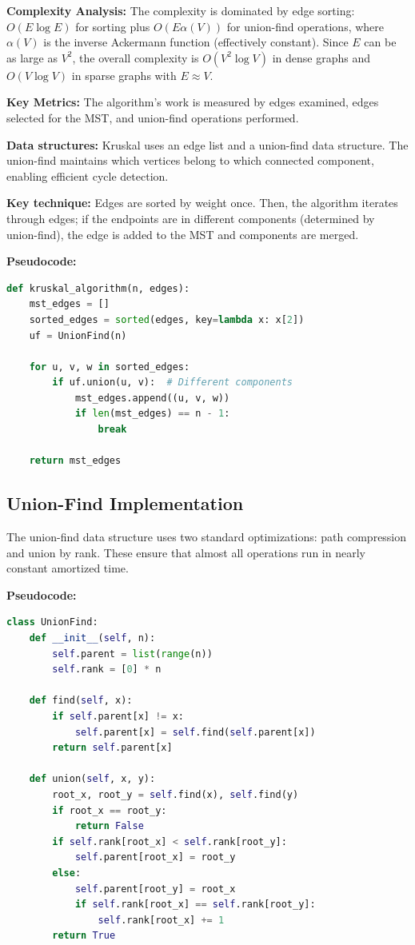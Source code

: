 \documentclass{labreport}
\begin{document}
    \textbf{Complexity Analysis:}
    The complexity is dominated by edge sorting: $O(E \log E)$ for sorting plus $O(E \alpha(V))$ for union-find operations, where $\alpha(V)$ is the inverse Ackermann function (effectively constant). Since $E$ can be as large as $V^2$, the overall complexity is $O(V^2 \log V)$ in dense graphs and $O(V \log V)$ in sparse graphs with $E \approx V$.

    \textbf{Key Metrics:} The algorithm's work is measured by edges examined, edges selected for the MST, and union-find operations performed.

\textbf{Data structures:} Kruskal uses an edge list and a union-find data structure. The union-find maintains which vertices belong to which connected component, enabling efficient cycle detection.

\textbf{Key technique:} Edges are sorted by weight once. Then, the algorithm iterates through edges; if the endpoints are in different components (determined by union-find), the edge is added to the MST and components are merged.

\textbf{Pseudocode:}
\begin{lstlisting}[language=Python]
def kruskal_algorithm(n, edges):
    mst_edges = []
    sorted_edges = sorted(edges, key=lambda x: x[2])
    uf = UnionFind(n)
    
    for u, v, w in sorted_edges:
        if uf.union(u, v):  # Different components
            mst_edges.append((u, v, w))
            if len(mst_edges) == n - 1:
                break
    
    return mst_edges
\end{lstlisting}

\subsection{Union-Find Implementation}

The union-find data structure uses two standard optimizations: path compression and union by rank. These ensure that almost all operations run in nearly constant amortized time.

\textbf{Pseudocode:}
\begin{lstlisting}[language=Python]
class UnionFind:
    def __init__(self, n):
        self.parent = list(range(n))
        self.rank = [0] * n
    
    def find(self, x):
        if self.parent[x] != x:
            self.parent[x] = self.find(self.parent[x])
        return self.parent[x]
    
    def union(self, x, y):
        root_x, root_y = self.find(x), self.find(y)
        if root_x == root_y:
            return False
        if self.rank[root_x] < self.rank[root_y]:
            self.parent[root_x] = root_y
        else:
            self.parent[root_y] = root_x
            if self.rank[root_x] == self.rank[root_y]:
                self.rank[root_x] += 1
        return True
\end{lstlisting}
\end{document}
